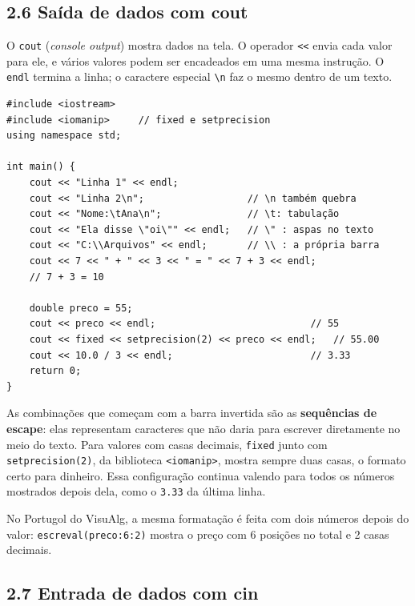\subsection{2.6 Saída de dados com cout}

O \texttt{cout} (\textit{console output}) mostra dados na tela. O operador \texttt{<<} envia cada valor para ele, e vários valores podem ser encadeados em uma mesma instrução. O \texttt{endl} termina a linha; o caractere especial \texttt{\textbackslash n} faz o mesmo dentro de um texto.

\begin{codigo}
\begin{Verbatim}[breaklines=true, breaksymbolleft={}, fontsize=\footnotesize]
#include <iostream>
#include <iomanip>     // fixed e setprecision
using namespace std;

int main() {
    cout << "Linha 1" << endl;
    cout << "Linha 2\n";                  // \n também quebra
    cout << "Nome:\tAna\n";               // \t: tabulação
    cout << "Ela disse \"oi\"" << endl;   // \" : aspas no texto
    cout << "C:\\Arquivos" << endl;       // \\ : a própria barra
    cout << 7 << " + " << 3 << " = " << 7 + 3 << endl;
    // 7 + 3 = 10

    double preco = 55;
    cout << preco << endl;                           // 55
    cout << fixed << setprecision(2) << preco << endl;   // 55.00
    cout << 10.0 / 3 << endl;                        // 3.33
    return 0;
}
\end{Verbatim}
\end{codigo}

As combinações que começam com a barra invertida são as \textbf{sequências de escape}: elas representam caracteres que não daria para escrever diretamente no meio do texto. Para valores com casas decimais, \texttt{fixed} junto com \texttt{setprecision(2)}, da biblioteca \texttt{<iomanip>}, mostra sempre duas casas, o formato certo para dinheiro. Essa configuração continua valendo para todos os números mostrados depois dela, como o \texttt{3.33} da última linha.

No Portugol do VisuAlg, a mesma formatação é feita com dois números depois do valor: \texttt{escreval(preco:6:2)} mostra o preço com 6 posições no total e 2 casas decimais.

\subsection{2.7 Entrada de dados com cin}


